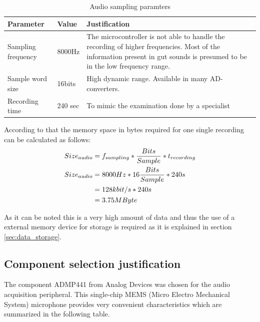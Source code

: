\begin{table}[htb]
\centering
\begin{tabular}{|l|l|m{4cm}|}
\hline
	\textbf{Parameter} &
	\textbf{Value} &
	\textbf{Justification} \\
\hline
	Sampling frequency &
	8000Hz &
	The microcontroller is not able to handle the recording of higher frequencies.
	Most of the information present in gut sounds is presumed to be in the low frequency range. \\
\hline
	Sample word size &
	16bits &
	High dynamic range. Available in many AD-converters. \\
\hline
	Recording time &
	240 sec &
	To mimic the examination done by a specialist \\
\hline
\end{tabular}
\caption{Audio sampling paramters}
\label{tab:sampling_parameters}
\end{table}

According to that the memory space in bytes required for one single recording can be calculated as follows:
\begin{align*}
\centering
Size_{audio}&=f_{sampling} * \frac{Bits}{Sample}* t_{recording} \\
Size_{audio}&=8000 Hz * 16 \frac{Bits}{Sample}* 240s \\
&= 128kbit/s * 240s \\
&= 3.75MByte
\end{align*}

As it can be noted this is a very high amount of data and thus the use of a external memory device for storage is required as it is explained in section \ref{sec:data_storage}.

\subsection{Component selection justification}
The component ADMP441 from Analog Devices was chosen for the audio acquisition peripheral. This single-chip MEMS (Micro Electro Mechanical System) microphone provides very convenient characteristics which are summarized in the following table.

